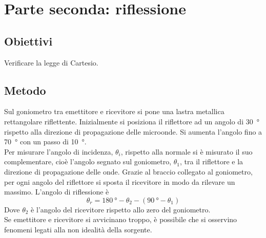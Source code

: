 \documentclass[a4paper]{article}
\begin{document}
\clearpage
\section{Parte seconda: riflessione}
\subsection{Obiettivi}
Verificare la legge di Cartesio.

\subsection{Metodo}
Sul goniometro tra emettitore e ricevitore si pone una lastra metallica rettangolare riflettente. Inizialmente si posiziona il riflettore ad un angolo di \SI[]{30}{\degree} rispetto alla direzione di propagazione delle microonde. Si aumenta l'angolo fino a \SI[]{70}{\degree} con un passo di \SI[]{10}{\degree}.\\
Per misurare l'angolo di incidenza, $ \theta_i $, rispetto alla normale si è misurato  il suo complementare, cioè l'angolo segnato sul goniometro, $ \theta_1 $, tra il riflettore e la direzione di propagazione delle onde. Grazie al braccio collegato al goniometro, per ogni angolo del riflettore si sposta il ricevitore in modo da rilevare un massimo. L'angolo di riflessione è
\[
	\theta_r = \SI[]{180}{\degree} - \theta_2 - (\SI[]{90}{\degree} - \theta_1)
\]
Dove $ \theta_2 $ è l'angolo del ricevitore rispetto allo zero del goniometro.\\
Se emettitore e ricevitore si avvicinano troppo, è possibile che si osservino fenomeni legati alla non idealità della sorgente.
\end{document}
